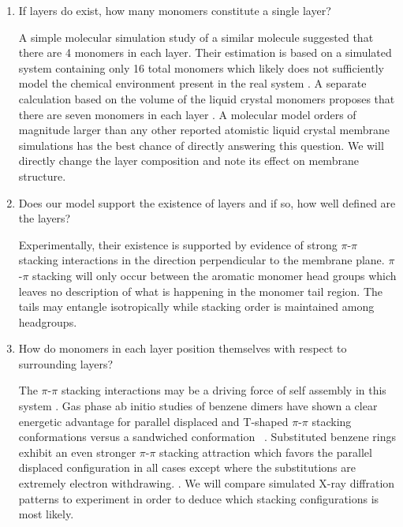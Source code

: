 \documentclass{article}
\begin{document}
  \begin{enumerate}

  \item If layers do exist, how many monomers constitute a single layer? \label{point:monomernum}
  
  A simple molecular simulation study of a similar molecule suggested that
  there are 4 monomers in each layer. Their estimation is based on a simulated
  system containing only 16 total monomers which likely does not sufficiently
  model the chemical environment present in the real system
  \cite{zhu_methacrylated_2006}.  A separate calculation based on the volume of
  the liquid crystal monomers proposes that there are seven monomers in each
  layer \cite{resel_structural_2000}.  A molecular model orders of magnitude
  larger than any other reported atomistic liquid crystal membrane simulations
  has the best chance of directly answering this question.  We will directly
  change the layer composition and note its effect on membrane structure.

 \item Does our model support the existence of layers and if so, how well
 defined are the layers? \label{point:layers} 

  Experimentally, their existence is supported by evidence of strong $\pi$-$\pi$
  stacking interactions in the direction perpendicular to the membrane plane.
  $\pi$-$\pi$ stacking will only occur between the aromatic monomer head groups
  which leaves no description of what is happening in the monomer tail region.
  The tails may entangle isotropically while stacking order is maintained among
  headgroups. 

  \item How do monomers in each layer position themselves with respect to
  surrounding layers? \label{point:orientation}

  The $\pi$-$\pi$ stacking interactions may be a driving force of self assembly
  in this system \cite{gazit_possible_2002}. Gas phase ab initio studies of
  benzene dimers have shown a clear energetic advantage for parallel displaced
  and T-shaped $\pi$-$\pi$ stacking conformations versus a sandwiched
  conformation ~\cite{sinnokrot_estimates_2002}. Substituted benzene rings
  exhibit an even stronger $\pi$-$\pi$ stacking attraction which favors the
  parallel displaced configuration in all cases except where the substitutions
  are extremely electron withdrawing.
  \cite{waller_hybrid_2006,ringer_effect_2006}. We will compare simulated X-ray
  diffration patterns to experiment in order to deduce which stacking 
  configurations is most likely. 


\end{enumerate}
\end{document}
